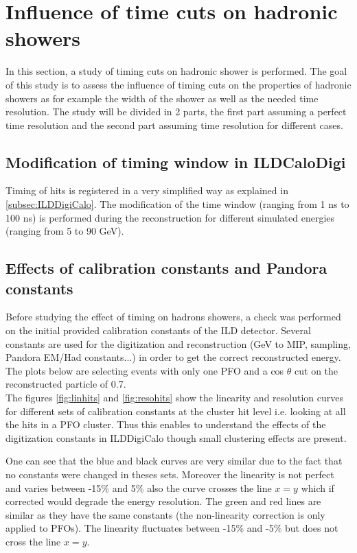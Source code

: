 \section{Influence of time cuts on hadronic showers}
\label{sec:ILDTiming}

In this section, a study of timing cuts on hadronic shower is performed. The goal of this study is to assess the influence of timing cuts on the properties of hadronic showers as for example the width of the shower as well as the needed time resolution. The study will be divided in 2 parts, the first part assuming a perfect time resolution and the second part assuming time resolution for different cases.

\subsection{Modification of timing window in ILDCaloDigi}

Timing of hits is registered in a very simplified way as explained in \ref{subsec:ILDDigiCalo}. The modification of the time window (ranging from 1 ns to 100 ns) is performed during the reconstruction for different simulated \kzeroL{} energies (ranging from 5 to 90 GeV).

\subsection{Effects of calibration constants and Pandora constants}

Before studying the effect of timing on hadrons showers, a check was performed on the initial provided calibration constants of the ILD detector. Several constants are used for the digitization and reconstruction (GeV to MIP, sampling, Pandora EM/Had constants...) in order to get the correct reconstructed energy. The plots below are selecting events with only one PFO and a cos $\theta$ cut on the reconstructed particle of 0.7.\\

The figures \ref{fig:linhits} and \ref{fig:resohits} show the linearity and resolution curves for different sets of calibration constants at the cluster hit level i.e. looking at all the hits in a PFO cluster. Thus this enables to understand the effects of the digitization constants in ILDDigiCalo though small clustering effects are present.

One can see that the blue and black curves are very similar due to the fact that no constants were changed in theses sets. Moreover the linearity is not perfect and varies between -15\% and 5\% also the curve crosses the line $x=y$ which if corrected would degrade the energy resolution. The green and red lines are similar as they have the same constants (the non-linearity correction is only applied to PFOs). The linearity fluctuates between -15\% and -5\% but does not cross the line $x=y$.

